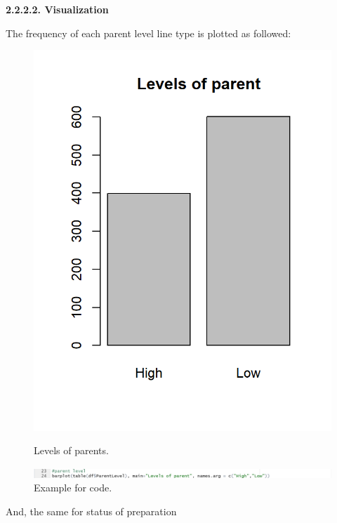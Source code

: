 \documentclass[a4paper]{article}
\begin{document}

\textbf{2.2.2.2. Visualization} \\ \newline
{}
The frequency of each parent level line type is plotted as followed:
\begin{figure}[H]
    \centering
    \begin{minipage}{0.5\textwidth}
        \centering
        \includegraphics[width = 0.8\linewidth]{Images/Activity2/8.png}
        \caption{Levels of parents.}
        \label{fig:vis1}
    \end{minipage}%
    \begin{minipage}{0.5\textwidth}
        \centering
        \includegraphics[width =1.5\linewidth]{Images/Activity2/7.png}
        \caption{Example for code.}
        \label{fig:vis2}
    \end{minipage}
\end{figure}
And, the same for status of preparation
\end{document}
